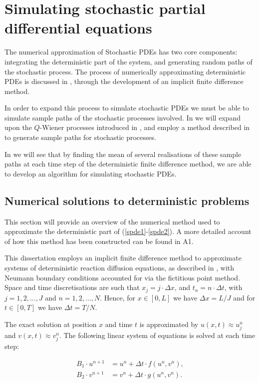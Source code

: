 \documentclass[12pt]{article}
\begin{document}
\section{Simulating stochastic partial differential equations}

The numerical approximation of Stochastic PDEs has two core components: integrating the deterministic part of the system, and generating random paths of the stochastic process. The process of numerically approximating deterministic PDEs is discussed in , through the development of an implicit finite difference method.  

In order to expand this process to simulate stochastic PDEs we must be able to simulate sample paths of the stochastic processes involved. In  we will expand upon the $Q$-Wiener processes introduced in , and employ a method described in \cite{Lord} to generate sample paths for stochastic processes. 

In  we will see that by finding the mean of several realisations of these sample paths at each time step of the deterministic finite difference method, we are able to develop an algorithm for simulating stochastic PDEs.  

\subsection{Numerical solutions to deterministic problems}
This section will provide an overview of the numerical method used to approximate the deterministic part of (\ref{spde1}-\ref{spde2}). A more detailed account of how this method has been constructed can be found in A1.  

This dissertation employs an implicit finite difference method to approximate systems of deterministic reaction diffusion equations, as described in \cite{Iserles}, with Neumann boundary conditions accounted for via the fictitious point method. Space and time discretisations are such that $x_j = j\cdot \Delta x$, and $t_n = n\cdot \Delta t$, with $j = 1, 2, ..., J$ and $n = 1,2,...,N$. Hence, for $x \in [0,L]$ we have $\Delta x = L/J$ and for $t \in [0,T]$ we have $\Delta t = T/N$.  

The exact solution at position $x$ and time $t$ is approximated by $u(x,t) \approx u_j^n$ and $v(x,t) \approx v_j^n$. The following linear system of equations is solved at each time step:

\begin{align}\label{ApxDPDE}
    B_1\cdot u^{n+1} &= u^n + \Delta t \cdot f(u^n, v^n),\\
    B_2\cdot v^{n+1} &= v^n + \Delta t \cdot g(u^n, v^n).
\end{align}
\end{document}
